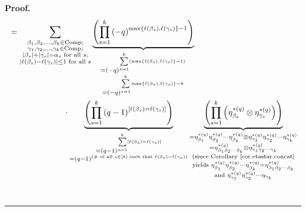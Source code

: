 \documentclass[numbers=enddot,12pt,final,onecolumn,notitlepage]{scrartcl}%
\theoremstyle{definition}
\newenvironment{proof}[1][Proof]{\noindent\textbf{#1.} }{\ \rule{0.5em}{0.5em}}
\let\sumnonlimits\sum
\let\prodnonlimits\prod
\renewcommand{\sum}{\sumnonlimits\limits}
\renewcommand{\prod}{\prodnonlimits\limits}
\begin{document}
\begin{proof}
\begin{align*}
&  =\sum_{\substack{\beta_{1},\beta_{2},\ldots,\beta_{k}\in
\operatorname*{Comp};\\\gamma_{1},\gamma_{2},\ldots,\gamma_{k}\in
\operatorname*{Comp};\\\left\vert \beta_{s}\right\vert +\left\vert \gamma
_{s}\right\vert =\alpha_{s}\text{ for all }s;\\\left\vert \ell\left(
\beta_{s}\right)  -\ell\left(  \gamma_{s}\right)  \right\vert \leq1\text{ for
all }s}}\underbrace{\left(  \prod_{s=1}^{k}\left(  -q\right)  ^{\max\left\{
\ell\left(  \beta_{s}\right)  ,\ell\left(  \gamma_{s}\right)  \right\}
-1}\right)  }_{\substack{=\left(  -q\right)  ^{\sum_{s=1}^{k}\left(
\max\left\{  \ell\left(  \beta_{s}\right)  ,\ell\left(  \gamma_{s}\right)
\right\}  -1\right)  }\\=\left(  -q\right)  ^{\sum_{s=1}^{k}\max\left\{
\ell\left(  \beta_{s}\right)  ,\ell\left(  \gamma_{s}\right)  \right\}  -k}%
}}\\
&  \ \ \ \ \ \ \ \ \ \ \ \ \ \ \ \ \ \ \ \ \cdot\underbrace{\left(
\prod_{s=1}^{k}\left(  q-1\right)  ^{\left[  \ell\left(  \beta_{s}\right)
=\ell\left(  \gamma_{s}\right)  \right]  }\right)  }_{\substack{=\left(
q-1\right)  ^{\sum_{s=1}^{k}\left[  \ell\left(  \beta_{s}\right)  =\ell\left(
\gamma_{s}\right)  \right]  }\\=\left(  q-1\right)  ^{\left(  \text{\# of all
}s\in\left[  k\right]  \text{ such that }\ell\left(  \beta_{s}\right)
=\ell\left(  \gamma_{s}\right)  \right)  }}}\underbrace{\left(  \prod
_{s=1}^{k}\left(  \eta_{\beta_{s}}^{\ast\left(  q\right)  }\otimes\eta
_{\gamma_{s}}^{\ast\left(  q\right)  }\right)  \right)  }_{\substack{=\eta
_{\beta_{1}}^{\ast\left(  q\right)  }\eta_{\beta_{2}}^{\ast\left(  q\right)
}\cdots\eta_{\beta_{k}}^{\ast\left(  q\right)  }\otimes\eta_{\gamma_{1}}%
^{\ast\left(  q\right)  }\eta_{\gamma_{2}}^{\ast\left(  q\right)  }\cdots
\eta_{\gamma_{k}}^{\ast\left(  q\right)  }\\=\eta_{\beta_{1}\beta_{2}%
\cdots\beta_{k}}^{\ast\left(  q\right)  }\otimes\eta_{\gamma_{1}\gamma
_{2}\cdots\gamma_{k}}^{\ast\left(  q\right)  }\\\text{(since Corollary
\ref{cor.etastar.concat}}\\\text{yields }\eta_{\beta_{1}}^{\ast\left(
q\right)  }\eta_{\beta_{2}}^{\ast\left(  q\right)  }\cdots\eta_{\beta_{k}%
}^{\ast\left(  q\right)  }=\eta_{\beta_{1}\beta_{2}\cdots\beta_{k}}%
^{\ast\left(  q\right)  }\\\text{and }\eta_{\gamma_{1}}^{\ast\left(  q\right)
}\eta_{\gamma_{2}}^{\ast\left(  q\right)  }\cdots\eta_{\gamma_{k}}%
}}
\end{align*}
\end{proof}
\end{document}

